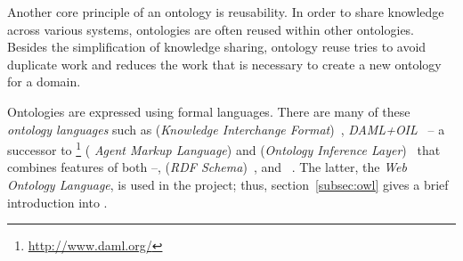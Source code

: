 \vspace{1em}

Another core principle of an ontology is reusability\cite{reuse1,reuse2}. In order to share knowledge across various systems, ontologies are often reused within other ontologies. Besides the simplification of knowledge sharing, ontology reuse tries to avoid duplicate work and reduces the work that is necessary to create a new ontology for a domain.

\vspace{1em}

Ontologies are expressed using formal languages. There are many of these \emph{ontology languages} such as  (\emph{Knowledge Interchange Format})~\cite{KIFReference}, \emph{DAML+OIL}~\cite{DAML+OIL} -- a successor to \footnote{\href{http://www.daml.org/}{http://www.daml.org/}} (\emph{ Agent Markup Language}) and  (\emph{Ontology Inference Layer})~\cite{OIL} that combines features of both --,  (\emph{RDF Schema})~\cite{RDFS}, and ~\cite{OWL}. The latter, the \emph{Web Ontology Language}, is used in the \thinkhome project; thus, section~\ref{subsec:owl} gives a brief introduction into .


